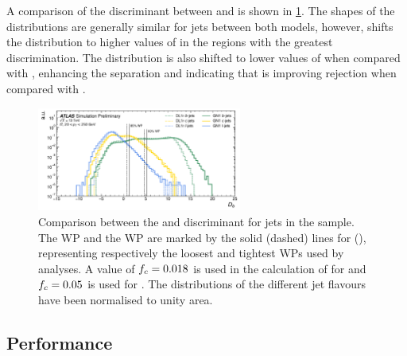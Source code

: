 A comparison of the \btag discriminant \Db between \DLr and \GNN is shown in \cref{fig:ttbar_btag_disc}. 
The shapes of the \Db distributions are generally similar for \bcl jets between both models, however, \GNN shifts the \bjet distribution to higher values of \Db in the regions with the greatest discrimination.
The \GNN \cjet distribution is also shifted to lower values of \Db when compared with \DLr, enhancing the separation and indicating that \GNN is improving \cjet rejection when compared with \DLr.

\begin{figure}[!htb]
    \centering
    \includegraphics[width=0.6\textwidth]{chapters/gnn_tagger/figs/results/main/ttbar/ttbar_score_DL1r_GN120220509_btag.pdf}
    \caption{Comparison between the \DLr and \GNN \btag discriminant \Db for jets in the \ttbar sample.
    The  WP and the  WP are marked by the solid (dashed) lines for \GNN (\DLr), representing respectively the loosest and tightest WPs used by analyses.
    A value of $f_c = 0.018$ is used in the calculation of \Db for \DLr and $f_c = 0.05$ is used for \GNN. The distributions of the different jet flavours have been normalised to unity area.}
    \label{fig:ttbar_btag_disc}
\end{figure}



\subsection{\texorpdfstring{\btagging}{b-tagging} Performance}\label{sec:gnn_btag_perf}

